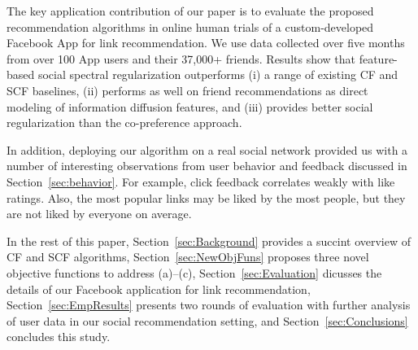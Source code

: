 The key application contribution of our paper is to evaluate the
proposed recommendation algorithms in online human trials of a
custom-developed Facebook App for link recommendation.  We use data
collected over five months from over 100 App users and their 37,000+
friends.  Results show that feature-based social spectral 
regularization outperforms (i) a range of
existing CF and SCF baselines, (ii) performs as well on friend
recommendations as direct modeling of information diffusion features,
and (iii) provides better social regularization than the co-preference
approach.

In addition, deploying our algorithm on a real social network provided
us with a number of interesting observations from user behavior and
feedback discussed in Section~\ref{sec:behavior}.  For example, click
feedback correlates weakly with like ratings.  Also, the most
popular links may be liked by the most people, but they are not liked
by everyone on average.

In the rest of this paper, Section~\ref{sec:Background} provides a
succint overview of CF and SCF algorithms,
Section~\ref{sec:NewObjFuns} proposes three novel objective functions
to address (a)--(c), Section~\ref{sec:Evaluation} dicusses the details
of our Facebook application for link recommendation,
Section~\ref{sec:EmpResults} presents two rounds of evaluation 
with further analysis of user data in our
social recommendation setting, and Section~\ref{sec:Conclusions}
concludes this study.

